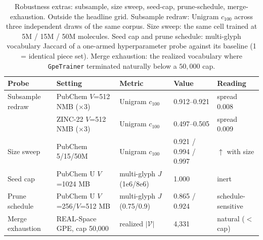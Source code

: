 \begin{table}[htbp]
  \centering
  \caption{Robustness extras: subsample, size sweep, seed-cap, prune-schedule, merge-exhaustion. Outside the headline grid. Subsample redraw: Unigram $c_{100}$ across three independent draws of the same corpus. Size sweep: the same cell trained at 5M / 15M / 50M molecules. Seed cap and prune schedule: multi-glyph vocabulary Jaccard of a one-armed hyperparameter probe against its baseline (1 = identical piece set). Merge exhaustion: the realized vocabulary where \texttt{GpeTrainer} terminated naturally below a $50{,}000$ cap.}
  \label{tab:results-extras}
  \footnotesize
  \begin{tabular}{@{}l l l l l@{}}
    \toprule
    Probe & Setting & Metric & Value & Reading \\
    \midrule
    Subsample redraw & PubChem $V$=512 NMB ($\times$3) & Unigram $c_{100}$ & 0.912--0.921 & spread 0.008 \\
     & ZINC-22 $V$=512 NMB ($\times$3) & Unigram $c_{100}$ & 0.497--0.505 & spread 0.009 \\
    Size sweep & PubChem 5/15/50M & Unigram $c_{100}$ & 0.921 / 0.994 / 0.997 & $\uparrow$ with size \\
    Seed cap & PubChem U $V$=1024 MB & multi-glyph $J$ (1e6/8e6) & 1.000 & inert \\
    Prune schedule & PubChem U $V$=256/$V$=512 MB & multi-glyph $J$ (0.75/0.9) & 0.865 / 0.924 & schedule-sensitive \\
    Merge exhaustion & REAL-Space GPE, cap 50,000 & realized $|\mathcal{V}|$ & 4,331 & natural ($<$ cap) \\
    \bottomrule
  \end{tabular}
\end{table}
